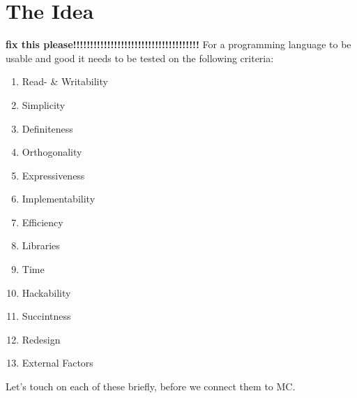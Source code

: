 \section{The Idea}

\textbf{fix this please!!!!!!!!!!!!!!!!!!!!!!!!!!!!!!!!!!!!!}
  For a programming language to be usable and good it needs to be tested on  the following criteria\cite{khedker1997makes,graham2004hackers}:

\begin{multicols}{3}
\begin{enumerate}
  \item Read- \& Writability
  \item Simplicity
  \item Definiteness
  \item Orthogonality
  \item Expressiveness
  \item Implementability
  \item Efficiency
  \item Libraries
  \item Time
  \item Hackability
  \item Succintness
  \item Redesign
  \item External Factors
\end{enumerate}
\end{multicols}
Let's touch on each of these briefly, before we connect them to MC.

